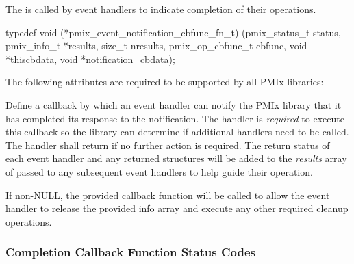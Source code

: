 \summary

The  is called by event handlers to indicate completion of their operations.

\cspecificstart
\begin{codepar}
typedef void (*pmix_event_notification_cbfunc_fn_t)
    (pmix_status_t status,
     pmix_info_t *results, size_t nresults,
     pmix_op_cbfunc_t cbfunc, void *thiscbdata,
     void *notification_cbdata);
\end{codepar}
\cspecificend

\begin{arglist}
\end{arglist}

\reqattrstart
The following attributes are required to be supported by all \ac{PMIx} libraries:


\reqattrend

\descr

Define a callback by which an event handler can notify the \ac{PMIx} library that it has completed its response to the notification. The handler is \textit{required} to execute this callback so the library can determine if additional handlers need to be called. The handler shall return  if no further action is required. The return status of each event handler and any returned  structures will be added to the \textit{results} array of  passed to any subsequent event handlers to help guide their operation.

If non-NULL, the provided callback function will be called to allow the event handler to release the provided info array and execute any other required cleanup operations.


\subsubsection{Completion Callback Function Status Codes}

